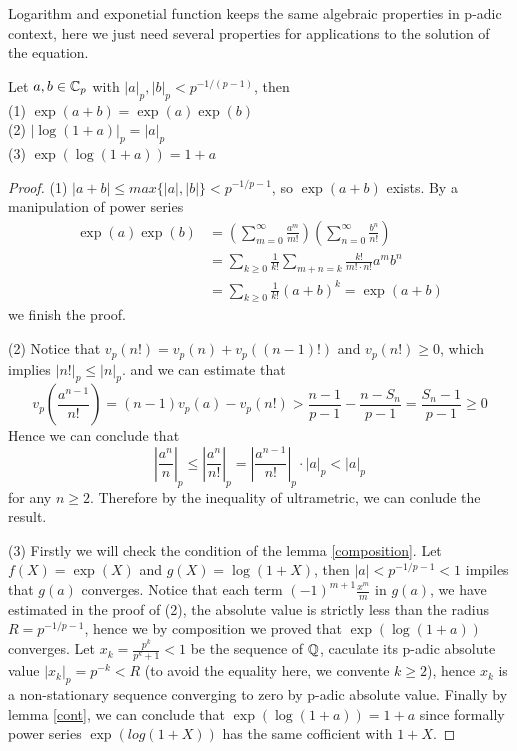 Logarithm and exponetial function keeps the same algebraic properties in p-adic context, here we just need several properties for applications to the solution of the equation.
\begin{proposition}
    Let \(a,b \in \mathbb{C}_p\) with \(|a|_p, |b|_p < p^{-1/(p-1)} \), then\\
    (1) \(\exp (a+b)  = \exp (a) \exp(b)\) \\
    (2) \(|\log(1+a)|_p = |a|_p\)\\
    (3) \(\exp (\log (1+a)) = 1+a\)
    \begin{proof}
        (1) \(|a+b|\leq max \{|a|,|b|\}<p^{-1/p-1}\), so \(\exp(a+b)\) exists. By a manipulation of power series
        \begin{align*}
           \exp(a)\exp(b) &= (\sum_{m=0}^{\infty}\frac{a^m}{m!})(\sum_{n=0}^{\infty}\frac{b^n}{n!}) \\
           &= \sum_{k\geq 0}\frac{1}{k!}\sum_{m+n=k}\frac{k!}{m!\cdot n!}a^mb^n\\
           &= \sum_{k\geq 0}\frac{1}{k!}(a+b)^k = \exp(a+b)
        \end{align*}
        we finish the proof.

        (2) Notice that \(v_p(n!)=v_p(n)+v_p((n-1)!)\) and \(v_p(n!)\geq 0\), which implies \(|n!|_p \leq |n|_p\). and we can estimate that
        \[v_p(\frac{a^{n-1}}{n!}) = (n-1)v_p(a)-v_p(n!) > \frac{n-1}{p-1} - \frac{n-S_n}{p-1} = \frac{S_n-1}{p-1} \geq 0\]
        Hence we can conclude that 
        \[|\frac{a^n}{n}|_p \leq |\frac{a^n}{n!}|_p = |\frac{a^{n-1}}{n!}|_p \cdot|a|_p < |a|_p\]        
        for any \(n \geq 2\). Therefore by the inequality of ultrametric, we can conlude the result.

        (3) Firstly we will check the condition of the lemma \ref{composition}. Let \(f(X) = \exp(X)\) and \(g(X) = \log(1+X)\), then \(|a| < p^{-1/p-1} <1\) impiles that \(g(a)\) converges. Notice that each term \((-1)^{m+1}\frac{x^m}{m}\) in \(g(a)\), we have estimated in the proof of (2), the absolute value is strictly less than the radius \(R = p^{-1/p-1}\), hence we by composition we proved that \(\exp(\log(1+a))\) converges. Let \(x_k = \frac{p^k}{p^k+1} <1\) be the sequence of \(\mathbb{Q}\), caculate its p-adic absolute value \(|x_k|_p=p^{-k} < R\) (to avoid the equality here, we convente \(k \geq 2\)), hence \(x_k\) is a non-stationary sequence converging to zero by p-adic absolute value. Finally by lemma \ref{cont}, we can conclude that \( \exp(\log(1+a)) = 1+a\) since formally power series \(\exp(log(1+X))\) has the same cofficient with \(1+X\).

    \end{proof}
\end{proposition}


